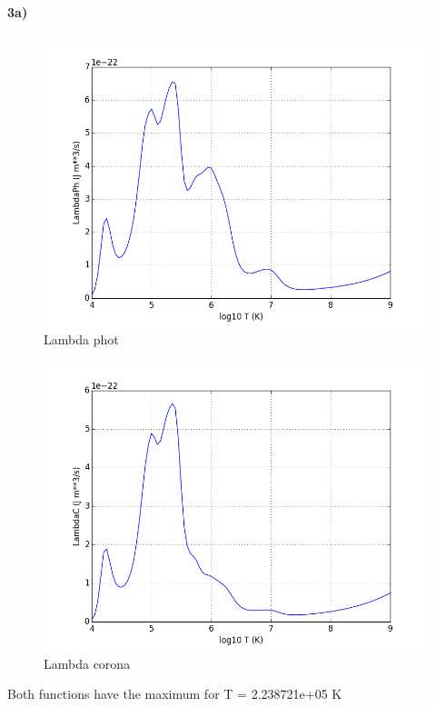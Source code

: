 \documentclass[10pt]{book}
\begin{document}
\paragraph{3a)}

\begin{figure}[!ht]
 \centering
 \includegraphics[scale=0.5]{lambdaPh.png}
 \caption{ Lambda phot}
\end{figure}

\begin{figure}[!ht]
 \centering
 \includegraphics[scale=0.5]{lambdaC.png}
 \caption{ Lambda corona}
\end{figure}

Both functions have the maximum for T = 2.238721e+05 K
\end{document}
